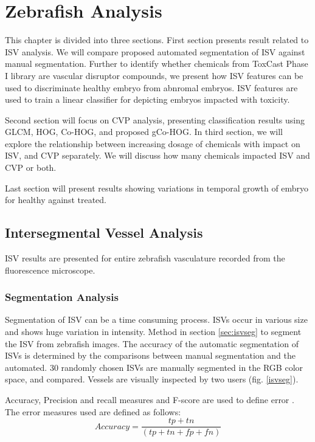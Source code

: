 \chapter{Zebrafish Analysis}\label{chap:results}

This chapter is divided into three sections. First section presents result related to ISV analysis. We will compare proposed automated segmentation of ISV against manual segmentation. Further to identify whether chemicals from ToxCast Phase I library are vascular disruptor compounds, we present how ISV features can be used to discriminate healthy embryo from abnromal embryos. ISV features are used to train a linear classifier for depicting embryos impacted with toxicity. 

Second section will focus on CVP analysis, presenting classification results using GLCM, HOG, Co-HOG, and proposed gCo-HOG. In third section, we will explore the relationship between increasing dosage of chemicals with impact on ISV, and CVP separately. We will discuss how many chemicals impacted ISV and CVP or both.

Last section will present results showing variations in temporal growth of embryo for healthy against treated. 


\section{Intersegmental Vessel Analysis}\label{sec:isvanalysis}
ISV results are presented for entire zebrafish vasculature recorded from the fluorescence microscope. 

\subsection{Segmentation Analysis}
Segmentation of ISV can be a time consuming process. ISVs occur in various size and shows huge variation in intensity. Method in section \ref{sec:isvseg} to segment the ISV from zebrafish images. The accuracy of the automatic segmentation of ISVs is determined by the comparisons between manual segmentation and the automated. 30 randomly chosen ISVs are manually segmented in the RGB color space, and compared. Vessels are visually inspected by two users (fig. \ref{isvseg}). 


Accuracy, Precision and recall measures and F-score are used to define error \cite{Martin01}. The error measures used are defined as follows:
\begin{equation}
Accuracy = \frac{tp + tn}{(tp + tn + fp + fn)}
\end{equation}

